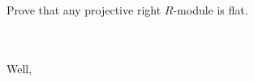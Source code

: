 Prove that any projective right $R$-module is flat.\\\\

\begin{solution}\renewcommand{\qedsymbol}{}\ \\
    Well,
\end{solution}